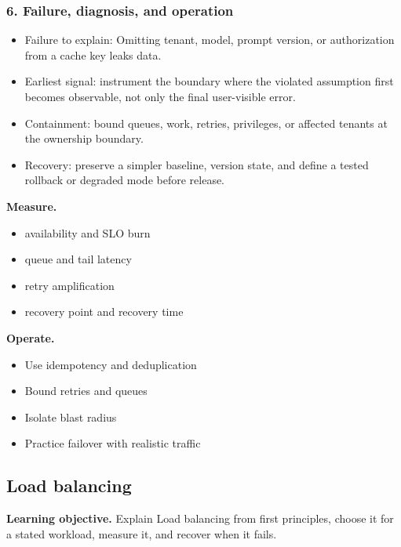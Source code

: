 \subsubsection*{6. Failure, diagnosis, and operation}
\begin{itemize}
\item Failure to explain: Omitting tenant, model, prompt version, or authorization from a cache key leaks data.
\item Earliest signal: instrument the boundary where the violated assumption first becomes observable, not only the final user-visible error.
\item Containment: bound queues, work, retries, privileges, or affected tenants at the ownership boundary.
\item Recovery: preserve a simpler baseline, version state, and define a tested rollback or degraded mode before release.
\end{itemize}
\textbf{Measure.}\begin{itemize}
\item availability and SLO burn
\item queue and tail latency
\item retry amplification
\item recovery point and recovery time
\end{itemize}
\textbf{Operate.}\begin{itemize}
\item Use idempotency and deduplication
\item Bound retries and queues
\item Isolate blast radius
\item Practice failover with realistic traffic
\end{itemize}
\subsection{Load balancing}
\textbf{Learning objective.} Explain Load balancing from first principles, choose it for a stated workload, measure it, and recover when it fails.
